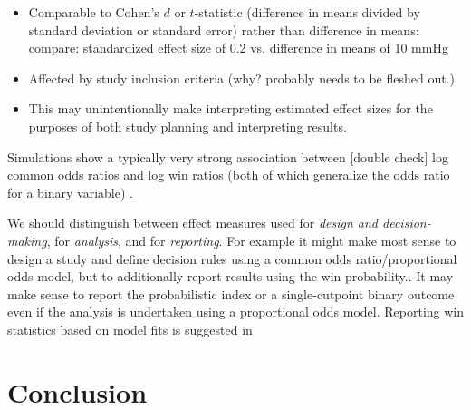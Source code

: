 \documentclass[
  11pt,
  fleqn
]{article}
\begin{document}
\begin{itemize}
  \item Comparable to Cohen's $d$ or $t$-statistic (difference in
    means divided by standard deviation or standard error) rather than
    difference in means: compare: standardized effect size of 0.2 vs.
    difference in means of 10 mmHg
  \item Affected by study inclusion criteria (why? probably needs to
    be fleshed out.)
  \item This may unintentionally make interpreting estimated effect
    sizes for the purposes of both study planning and interpreting results.
\end{itemize}

Simulations show a typically very strong association between
[double check] log common odds ratios and log win ratios (both of
which generalize the odds ratio for a binary variable)
\citep{harrellViolationProportionalOdds2020}.

We should distinguish between effect measures used for \emph{design
and decision-making},
for \emph{analysis}, and for
\emph{reporting}. For example it might make most sense to design a
study and define decision rules using a common odds
ratio/proportional odds model, but to
additionally report results using the win probability..
It may make
sense to report the probabilistic index or a
single-cutpoint binary outcome even if the analysis is undertaken using a
proportional odds model. Reporting win statistics based on model fits is
suggested in 
\cite{agrestiOrdinalProbabilityEffect2017,agrestiSimpleWaysInterpret2018}

\section{Conclusion}

\newpage

\printbibliography
\end{document}
